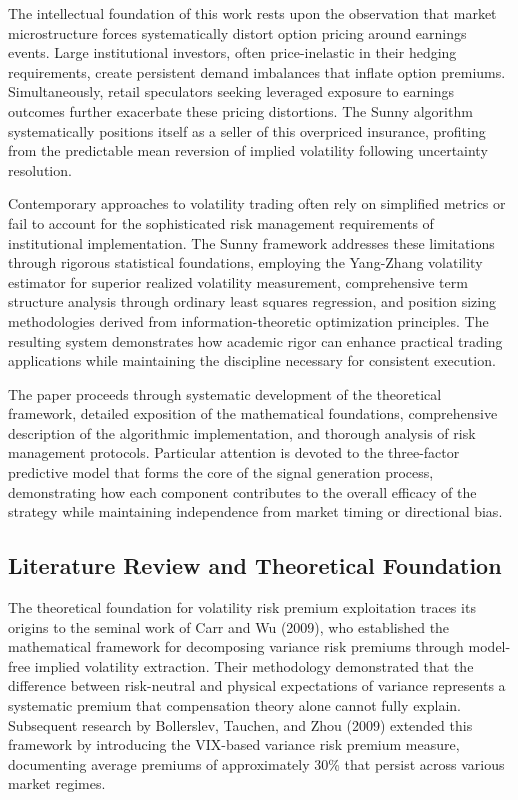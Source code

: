 \documentclass[
  american,
  11pt,
  11pt,
  letterpaper,
  onecolumn]{article}
\begin{document}
The intellectual foundation of this work rests upon the observation that
market microstructure forces systematically distort option pricing
around earnings events. Large institutional investors, often
price-inelastic in their hedging requirements, create persistent demand
imbalances that inflate option premiums. Simultaneously, retail
speculators seeking leveraged exposure to earnings outcomes further
exacerbate these pricing distortions. The Sunny algorithm systematically
positions itself as a seller of this overpriced insurance, profiting
from the predictable mean reversion of implied volatility following
uncertainty resolution.

Contemporary approaches to volatility trading often rely on simplified
metrics or fail to account for the sophisticated risk management
requirements of institutional implementation. The Sunny framework
addresses these limitations through rigorous statistical foundations,
employing the Yang-Zhang volatility estimator for superior realized
volatility measurement, comprehensive term structure analysis through
ordinary least squares regression, and position sizing methodologies
derived from information-theoretic optimization principles. The
resulting system demonstrates how academic rigor can enhance practical
trading applications while maintaining the discipline necessary for
consistent execution.

The paper proceeds through systematic development of the theoretical
framework, detailed exposition of the mathematical foundations,
comprehensive description of the algorithmic implementation, and
thorough analysis of risk management protocols. Particular attention is
devoted to the three-factor predictive model that forms the core of the
signal generation process, demonstrating how each component contributes
to the overall efficacy of the strategy while maintaining independence
from market timing or directional bias.

\subsection{Literature Review and Theoretical
Foundation}\label{literature-review-and-theoretical-foundation}

The theoretical foundation for volatility risk premium exploitation
traces its origins to the seminal work of Carr and Wu (2009), who
established the mathematical framework for decomposing variance risk
premiums through model-free implied volatility extraction. Their
methodology demonstrated that the difference between risk-neutral and
physical expectations of variance represents a systematic premium that
compensation theory alone cannot fully explain. Subsequent research by
Bollerslev, Tauchen, and Zhou (2009) extended this framework by
introducing the VIX-based variance risk premium measure, documenting
average premiums of approximately 30\% that persist across various
market regimes.
\end{document}
